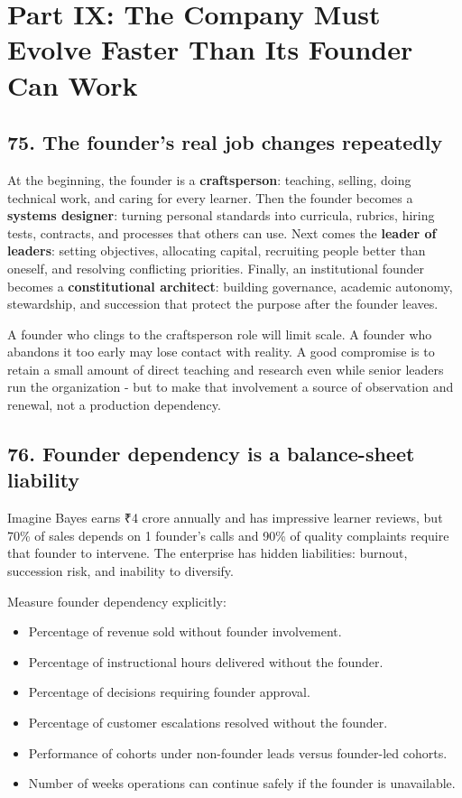 
\section*{Part IX: The Company Must Evolve Faster Than Its Founder Can Work}

\subsection{75. The founder's real job changes repeatedly}

At the beginning, the founder is a \textbf{craftsperson}: teaching, selling, doing technical work, and caring for every learner. Then the founder becomes a \textbf{systems designer}: turning personal standards into curricula, rubrics, hiring tests, contracts, and processes that others can use. Next comes the \textbf{leader of leaders}: setting objectives, allocating capital, recruiting people better than oneself, and resolving conflicting priorities. Finally, an institutional founder becomes a \textbf{constitutional architect}: building governance, academic autonomy, stewardship, and succession that protect the purpose after the founder leaves.

A founder who clings to the craftsperson role will limit scale. A founder who abandons it too early may lose contact with reality. A good compromise is to retain a small amount of direct teaching and research even while senior leaders run the organization - but to make that involvement a source of observation and renewal, not a production dependency.

\subsection{76. Founder dependency is a balance-sheet liability}

Imagine Bayes earns \textnormal{₹}4 crore annually and has impressive learner reviews, but 70\% of sales depends on 1 founder's calls and 90\% of quality complaints require that founder to intervene. The enterprise has hidden liabilities: burnout, succession risk, and inability to diversify.

Measure founder dependency explicitly:

\begin{itemize}[leftmargin=*,itemsep=1.5pt]
  \item Percentage of revenue sold without founder involvement.
  \item Percentage of instructional hours delivered without the founder.
  \item Percentage of decisions requiring founder approval.
  \item Percentage of customer escalations resolved without the founder.
  \item Performance of cohorts under non-founder leads versus founder-led cohorts.
  \item Number of weeks operations can continue safely if the founder is unavailable.
\end{itemize}

